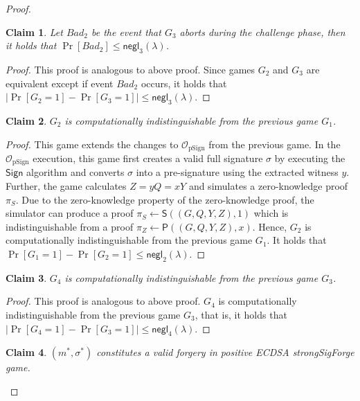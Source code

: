 \documentclass{llncs}
\newtheorem{Claim}{Claim}
\begin{document}
\begin{proof}
\begin{Claim}
Let $Bad_2$ be the event that $G_3$ aborts during the challenge phase, then it holds that $\Pr[Bad_2] \leq \mathsf{negl}_3(\lambda)$.
\end{Claim}

\begin{proof}
This proof is analogous to above proof. Since games $G_2$ and $G_3$ are equivalent except if event $Bad_2$ occurs, it holds that $|\Pr[G_2 = 1] - \Pr[G_3 = 1]|\leq\mathsf{negl}_3(\lambda).$
\end{proof}

\begin{Claim}
$G_2$ is computationally indistinguishable from the previous game $G_1$.
\end{Claim}

\begin{proof}
This game extends the changes to $\mathcal{O}_{\text{pSign}}$ from the previous game. In the $\mathcal{O}_{\text{pSign}}$ execution, this game first creates a valid full signature $\sigma$ by executing the $\mathsf{Sign}$ algorithm and converts $\sigma$ into a pre-signature using the extracted witness $y$. Further, the game calculates $Z=yQ=xY$ and simulates a zero-knowledge proof $\pi_S$. Due to the zero-knowledge property of the zero-knowledge proof, the simulator can produce a proof $\pi_S\leftarrow \mathsf{S}((G,Q,Y,Z),1)$ which is indistinguishable from a proof $\pi_Z\leftarrow \mathsf{P}((G,Q,Y,Z),x)$. Hence, $G_2$ is computationally  indistinguishable from the previous game $G_1$. It holds that 
$\Pr[G_1 = 1] - \Pr[G_2 = 1] \leq \mathsf{negl}_2(\lambda)$.
\end{proof}

\begin{Claim}
$G_4$ is computationally indistinguishable from the previous game $G_3$.
\end{Claim}

\begin{proof}
This proof is analogous to above proof. $G_4$ is computationally indistinguishable from the previous game $G_3$, that is, it holds that $|\Pr[G_4 = 1] - \Pr[G_3 = 1]|\leq\mathsf{negl}_4(\lambda).$
\end{proof}

\begin{Claim}
$(m^*,\sigma^*)$ constitutes a valid forgery in positive ECDSA strongSigForge game.
\end{Claim}


\end{proof}
\end{document}
